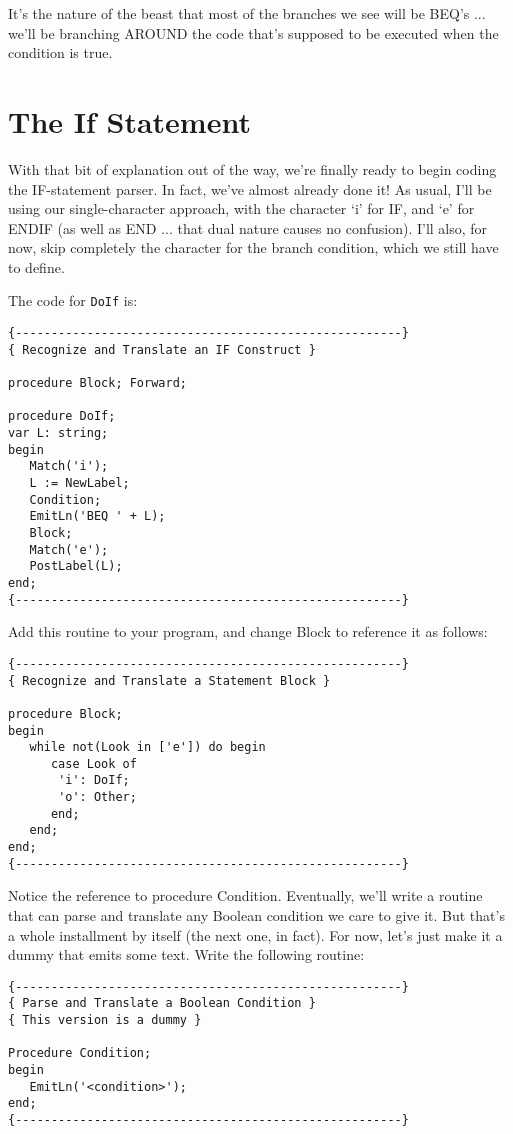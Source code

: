 It's the nature of the beast that most  of  the  branches  we see will  be  BEQ's  ... we'll  be branching AROUND the code  that's supposed to be executed when the condition is true.

\section{The If Statement}

With that bit of explanation out of the way, we're  finally ready to begin coding the IF-statement parser. In  fact, we've almost already  done  it!   As usual, I'll be using our single-character approach, with the character `i' for IF, and `e'  for  ENDIF  (as well  as END ... that dual nature causes  no  confusion). I'll also, for now, skip completely  the character for the branch condition, which we still have to define.

The code for {\tt DoIf} is:

\begin{verbatim}
{------------------------------------------------------}
{ Recognize and Translate an IF Construct }

procedure Block; Forward;

procedure DoIf;
var L: string;
begin
   Match('i');
   L := NewLabel;
   Condition;
   EmitLn('BEQ ' + L);
   Block;
   Match('e');
   PostLabel(L);
end;
{------------------------------------------------------}
\end{verbatim}

Add this routine to your program, and change  Block  to reference it as follows:

\begin{verbatim}
{------------------------------------------------------}
{ Recognize and Translate a Statement Block }

procedure Block;
begin
   while not(Look in ['e']) do begin
      case Look of
       'i': DoIf;
       'o': Other;
      end;
   end;
end;
{------------------------------------------------------}
\end{verbatim}

Notice the reference to procedure Condition. Eventually, we'll write a routine that  can  parse  and  translate any Boolean condition we care to give it. But  that's  a  whole  installment by itself (the next one, in fact). For  now, let's just make it a dummy that emits some text. Write the following routine:

\begin{verbatim}
{------------------------------------------------------}
{ Parse and Translate a Boolean Condition }
{ This version is a dummy }

Procedure Condition;
begin
   EmitLn('<condition>');
end;
{------------------------------------------------------}
\end{verbatim}

